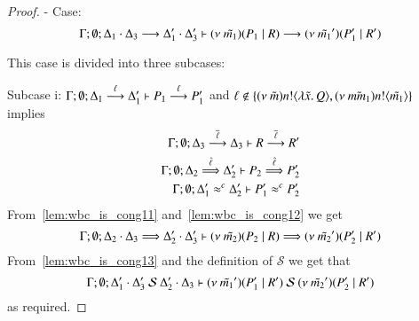 \begin{proof}
	\noi - Case:
	\[
		\horel{\Gamma}{\Delta_1 \cat \Delta_3}{\newsp{\tilde{m_1}}{P_1 \Par R}}
		{\by{}}
		{\Delta_1' \cat \Delta_3'}{\newsp{\tilde{m_1}'}{P_1' \Par R'}}
	\]

	\noi This case is divided into three subcases:

	\noi Subcase i: $\horel{\Gamma}{\Delta_1}{P_1}{\by{\ell}}{\Delta_1'}{P_1'}$
	and $\ell \notin \set{\news{\tilde{m}} \bactout{n}{\abs{\tilde{x}}{Q}}, \news{\tilde{mm_1}} \bactout{n}{\tilde{m_1}}}$ implies
%
	\begin{eqnarray}
		\horel{\Gamma}{\Delta_3}{R}{\by{\dual{\ell}}}{\Delta_3}{R'}
		\label{lem:wbc_is_cong11} \\
		\horel{\Gamma}{\Delta_2}{P_2}{\By{\hat{\ell}}}{\Delta_2'}{P_2'}
		\label{lem:wbc_is_cong12}\\
		\horel{\Gamma}{\Delta_1'}{P_1'}{\wbc}{\Delta_2'}{P_2'}
		\label{lem:wbc_is_cong13}
	\end{eqnarray}
%
	\noi From~\ref{lem:wbc_is_cong11} and~\ref{lem:wbc_is_cong12} we get
	\[
		\horel{\Gamma}{\Delta_2 \cat \Delta_3}{\newsp{\tilde{m_2}}{P_2 \Par R}}{\By{}}{\Delta_2' \cat \Delta_3'}{\newsp{\tilde{m_2}'}{P_2' \Par R'}}
	\]
%
	\noi From~\ref{lem:wbc_is_cong13} and the definition of $\mathcal{S}$ we get that
	\[
		\horel{\Gamma}{\Delta_1' \cat \Delta_3'}{\newsp{\tilde{m_1}'}{P_1' \Par R'}}{\ \mathcal{S}\ }{\Delta_2' \cat \Delta_3}{\newsp{\tilde{m_2}'}{P_2' \Par R'}}
	\]
	\noi as required.


\end{proof}

